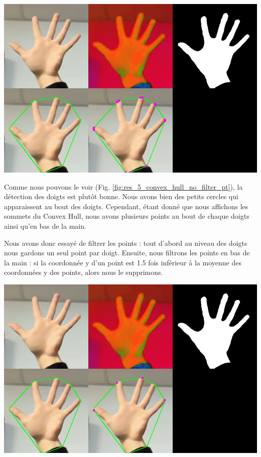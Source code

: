 \documentclass[11pt]{article}
\begin{document}
\begin{center}
    \includegraphics[width=\textwidth]{images/res_5_convex_hull_no_filter_pt.png}
    \label{fig:res_5_convex_hull_no_filter_pt}
\end{center}

Comme nous pouvons le voir (Fig. \ref{fig:res_5_convex_hull_no_filter_pt}), la détection des doigts est plutôt bonne. Nous avons bien des petits cercles qui apparaissent au bout des doigts. Cependant, étant donné que nous affichons les sommets du Convex Hull, nous avons plusieurs points au bout de chaque doigts ainsi qu'en bas de la main. \bigbreak

Nous avons donc essayé de filtrer les points : tout d'abord au niveau des doigts nous gardons un seul point par doigt. Ensuite, nous filtrons les points en bas de la main : si la coordonnée y d'un point est 1.5 fois inférieur à la moyenne des coordonnées y des points, alors nous le supprimons. \bigbreak

\begin{center}
    \includegraphics[width=\textwidth]{images/res_5_convex_hull_filter_1_y.png}
    \label{fig:res_5_convex_hull_filter_1_y}
\end{center}
\end{document}
